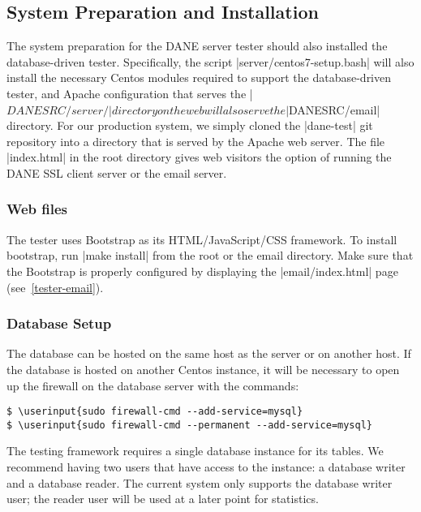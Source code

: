 \documentclass[preprint,3p,11pt]{elsarticle}
\newcommand\userinput[1]{\textbf{#1}}
\begin{document}
\subsection{System Preparation and Installation}
The system preparation for the DANE server tester should also
installed the database-driven tester. Specifically, the script |server/centos7-setup.bash| will also install the necessary
Centos modules required to support the database-driven tester, and
Apache configuration that serves the |$DANESRC/server/| directory on
the web will also serve the |$DANESRC/email| directory. For our
production system, we simply cloned the |dane-test| git repository
into a directory that is served by the Apache web server. The file
|index.html| in the root directory gives web visitors the option of
running the DANE SSL client server or the email server. 

\subsubsection{Web files}

The tester uses Bootstrap as its HTML/JavaScript/CSS framework. To
install bootstrap, run |make install| from the root or the email directory. Make
sure that the Bootstrap is properly configured by displaying the
|email/index.html| page (see~\ref{tester-email}).




\subsubsection{Database Setup}

The database can be hosted on the same host as the server or on
another host. If the database is hosted on another Centos instance,
it will be necessary to open up the firewall on the database server
with the commands:

\begin{Verbatim}[commandchars=\\\{\},fontsize=\small]
$ \userinput{sudo firewall-cmd --add-service=mysql}
$ \userinput{sudo firewall-cmd --permanent --add-service=mysql}
\end{Verbatim}

The testing framework requires a single database instance for its
tables. We recommend having two users that have access to the
instance: a database writer and a database reader. The current system
only supports the database writer user; the reader user will be used
at a later point for statistics.
\end{document}
